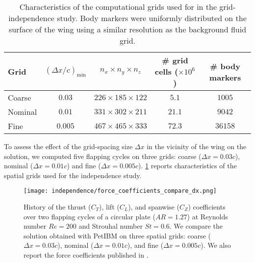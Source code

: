 \begin{table}[!h]
  \centering
  \begin{tabular}{lcccc}
    \hline\hline
    Grid & $(\Delta x / c)_\text{min}$ & $n_x \times n_y \times n_z$ & \# grid cells ($\times 10^6$) & \# body markers \\
    \hline
    Coarse & $0.03$ & $226 \times 185 \times 122$ & $5.1$ & $1005$ \\
    Nominal & $0.01$ & $331 \times 302 \times 211$ & $21.1$ & $9042$ \\
    Fine & $0.005$ & $467 \times 465 \times 333$ & $72.3$ & $36158$ \\
    \hline\hline
  \end{tabular}
  \caption{Characteristics of the computational grids used for in the grid-independence study. Body markers were uniformly distributed on the surface of the wing using a similar resolution as the background fluid grid.}
  \label{tab:independence_grid_charateristics}
\end{table}

To assess the effect of the grid-spacing size $\Delta x$ in the vicinity of the wing on the solution, we computed five flapping cycles on three grids: coarse ($\Delta x = 0.03c$), nominal ($\Delta x = 0.01c$) and fine ($\Delta x = 0.005c$).
\cref{tab:independence_grid_charateristics} reports characteristics of the spatial grids used for the independence study.

\begin{figure}[!h]
  \centering
  \texttt{[image: independence/force\_coefficients\_compare\_dx.png]}
  \caption{History of the thrust ($C_T$), lift ($C_L$), and spanwise ($C_Z$) coefficients over two flapping cycles of a circular plate ($AR = 1.27$) at Reynolds number $Re = 200$ and Strouhal number $St = 0.6$. We compare the solution obtained with PetIBM on three spatial grids: coarse ($\Delta x = 0.03c$), nominal ($\Delta x = 0.01c$), and fine ($\Delta x = 0.005c$). We also report the force coefficients published in \citet{li_dong_2016}.}
  \label{fig:independence_force_coefficients_dx}
\end{figure}

